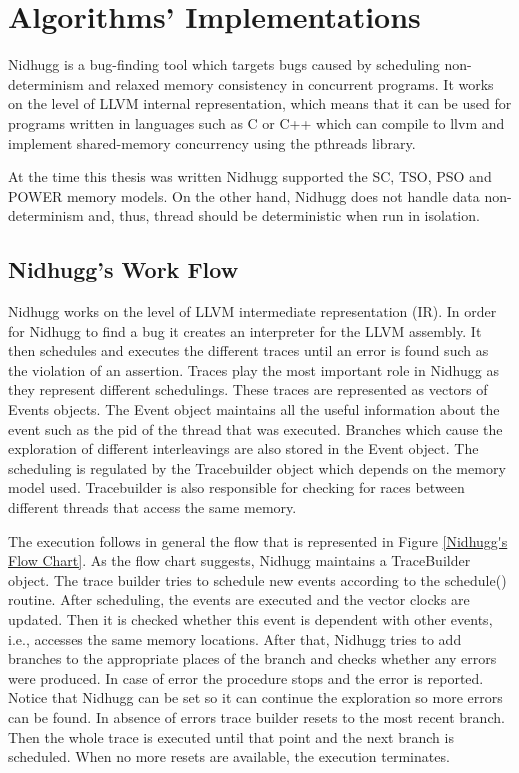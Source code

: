 \chapter{Algorithms' Implementations}
\label{implementations}

Nidhugg is a bug-finding tool which targets bugs caused by scheduling non-determinism
and relaxed memory consistency in concurrent programs. It works on the
level of LLVM internal representation, which means that it can be used
for programs written in languages such as C or C++ which can compile to llvm and implement shared-memory concurrency using the pthreads
library.

At the time this thesis was written Nidhugg supported the SC, TSO, PSO and POWER memory
models. On the other hand, Nidhugg does not handle data non-determinism and, thus,
thread should be deterministic when run in isolation.

\section{Nidhugg's Work Flow}

Nidhugg works on the level of LLVM intermediate representation (IR). In order for Nidhugg to find a bug it creates an
interpreter for the LLVM assembly. It then schedules and executes the different traces until an error is found such as
the violation of an assertion. Traces play the most important role in Nidhugg as they represent different schedulings.
These traces are represented as vectors of Events objects. The Event object maintains all the useful information about
the event such as the pid of the thread that was executed. Branches which cause the exploration of different
interleavings are also stored in the Event object. The scheduling is regulated by the Tracebuilder object which depends
on the memory model used. Tracebuilder is also responsible for checking for races between different threads that access
the same memory.

The execution follows in general the flow that is represented in Figure \ref{Nidhugg's Flow Chart}. As the flow chart
suggests, Nidhugg maintains a TraceBuilder object. The trace builder tries to schedule new events according to the
schedule() routine. After scheduling, the events are executed and the vector clocks are updated. Then it is checked
whether this event is dependent with other events, i.e., accesses the same memory locations. After that, Nidhugg tries
to add branches to the appropriate places of the branch and checks whether any errors were produced. In case of error
the procedure stops and the error is reported. Notice that Nidhugg can be set so it can continue the exploration so more
errors can be found. In absence of errors trace builder resets to the most recent branch. Then the whole trace is
executed until that point and the next branch is scheduled. When no more resets are available, the execution terminates.

